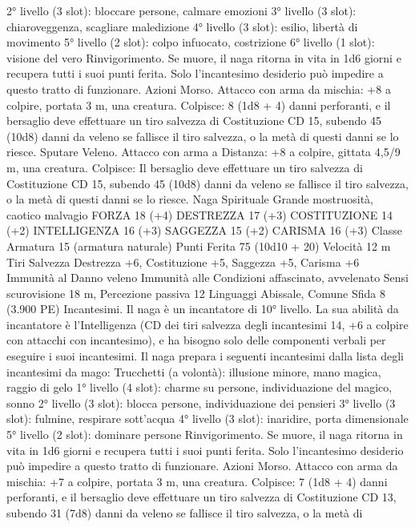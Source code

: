 \begin{multicols}{2}
2° livello (3 slot): bloccare persone, calmare emozioni
3° livello (3 slot): chiaroveggenza, scagliare maledizione
4° livello (3 slot): esilio, libertà di movimento
5° livello (2 slot): colpo infuocato, costrizione
6° livello (1 slot): visione del vero
Rinvigorimento. Se muore, il naga ritorna in vita in 1d6 giorni e
recupera tutti i suoi punti ferita. Solo l’incantesimo desiderio può
impedire a questo tratto di funzionare.
Azioni
Morso. Attacco con arma da mischia: +8 a colpire, portata 3 m,
una creatura.
Colpisce: 8 (1d8 + 4) danni perforanti, e il bersaglio deve
effettuare un tiro salvezza di Costituzione CD 15, subendo 45
(10d8) danni da veleno se fallisce il tiro salvezza, o la metà di
questi danni se lo riesce.
Sputare Veleno. Attacco con arma a Distanza: +8 a colpire,
gittata 4,5/9 m, una creatura.
Colpisce: Il bersaglio deve effettuare un tiro salvezza di
Costituzione CD 15, subendo 45 (10d8) danni da veleno se
fallisce il tiro salvezza, o la metà di questi danni se lo riesce.
Naga Spirituale
Grande mostruosità, caotico malvagio
FORZA 18 (+4)
DESTREZZA 17 (+3)
COSTITUZIONE 14 (+2)
INTELLIGENZA 16 (+3)
SAGGEZZA 15 (+2)
CARISMA 16 (+3)
Classe Armatura 15 (armatura naturale)
Punti Ferita 75 (10d10 + 20)
Velocità 12 m
Tiri Salvezza Destrezza +6, Costituzione +5, Saggezza +5,
Carisma +6
Immunità al Danno veleno
Immunità alle Condizioni affascinato, avvelenato
Sensi scurovisione 18 m, Percezione passiva 12
Linguaggi Abissale, Comune
Sfida 8 (3.900 PE)
Incantesimi. Il naga è un incantatore di 10° livello. La sua abilità
da incantatore è l’Intelligenza (CD dei tiri salvezza degli
incantesimi 14, +6 a colpire con attacchi con incantesimo), e ha
bisogno solo delle componenti verbali per eseguire i suoi
incantesimi. Il naga prepara i seguenti incantesimi dalla lista
degli incantesimi da mago:
Trucchetti (a volontà): illusione minore, mano magica, raggio di
gelo
1° livello (4 slot): charme su persone, individuazione del magico,
sonno
2° livello (3 slot): blocca persone, individuazione dei pensieri
3° livello (3 slot): fulmine, respirare sott'acqua
4° livello (3 slot): inaridire, porta dimensionale
5° livello (2 slot): dominare persone
Rinvigorimento. Se muore, il naga ritorna in vita in 1d6 giorni e
recupera tutti i suoi punti ferita. Solo l’incantesimo desiderio può
impedire a questo tratto di funzionare.
Azioni
Morso. Attacco con arma da mischia: +7 a colpire, portata 3 m,
una creatura.
Colpisce: 7 (1d8 + 4) danni perforanti, e il bersaglio deve
effettuare un tiro salvezza di Costituzione CD 13, subendo 31
(7d8) danni da veleno se fallisce il tiro salvezza, o la metà di

\end{multicols}
